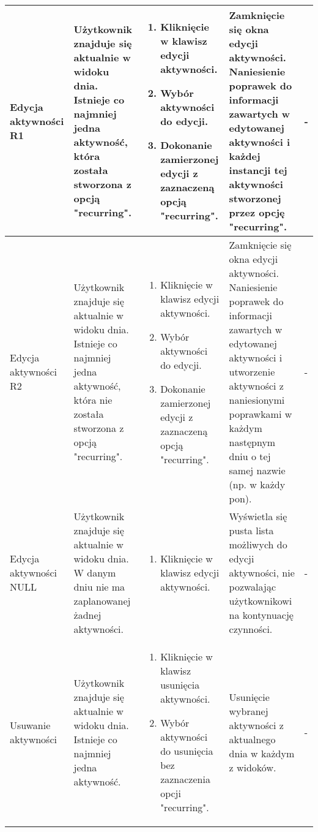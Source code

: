 \documentclass{article}
\begin{document}
\begin{flushleft}
\begin{longtable}[H]{| m{3.5cm} | m{3.5cm} | m{3.5cm} | m{3.5cm} | m{3.5cm} |}
	Edycja aktywności R1 & Użytkownik znajduje się aktualnie w widoku dnia. Istnieje co najmniej jedna aktywność, która została stworzona z opcją "recurring". & \begin{enumerate}[leftmargin =*, 
	topsep=0pt] \item Kliknięcie w klawisz edycji aktywności. \item Wybór aktywności do edycji. \item Dokonanie zamierzonej edycji z zaznaczeną opcją "recurring". \end{enumerate} & Zamknięcie się 
	okna edycji aktywności. Naniesienie poprawek do informacji zawartych w edytowanej aktywności i każdej instancji tej aktywności stworzonej przez opcję "recurring".  & - \\ \hline

	Edycja aktywności R2 & Użytkownik znajduje się aktualnie w widoku dnia. Istnieje co najmniej jedna aktywność, która nie została stworzona z opcją "recurring". & \begin{enumerate}[leftmargin =*, 
	topsep=0pt] \item Kliknięcie w klawisz edycji aktywności. \item Wybór aktywności do edycji. \item Dokonanie zamierzonej edycji z zaznaczeną opcją "recurring". \end{enumerate} & Zamknięcie się 
	okna edycji aktywności. Naniesienie poprawek do informacji zawartych w edytowanej aktywności i utworzenie aktywności z naniesionymi poprawkami w każdym następnym dniu o tej samej nazwie 
	(np. w każdy pon).  & - \\ \hline

	Edycja aktywności NULL & Użytkownik znajduje się aktualnie w widoku dnia. W danym dniu nie ma zaplanowanej żadnej aktywności. & \begin{enumerate}[leftmargin =*, topsep=0pt] \item Kliknięcie 
	w klawisz edycji aktywności. \end{enumerate} & Wyświetla się pusta lista możliwych do edycji aktywności, nie pozwalając użytkownikowi na kontynuację czynności. & - \\ \hline

	Usuwanie aktywności & Użytkownik znajduje się aktualnie w widoku dnia. Istnieje co najmniej jedna aktywność. & \begin{enumerate}[leftmargin =*, topsep=0pt] \item Kliknięcie w klawisz usunięcia 
	aktywności. \item Wybór aktywności do usunięcia bez zaznaczenia opcji "recurring". \end{enumerate} & Usunięcie wybranej aktywności z aktualnego dnia w każdym z widoków. & - \\ \hline


\end{longtable}
\end{flushleft}
\end{document}

